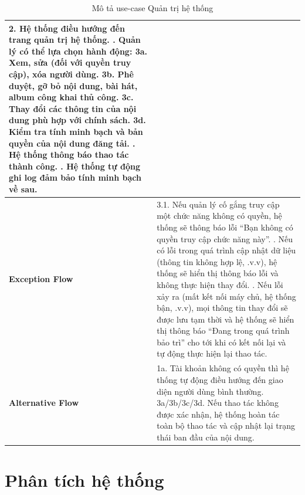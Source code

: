 \documentclass[a4paper]{article}
\newcommand{\cach}{\hspace*{1.5em}\ignorespaces}
\begin{document}
\begin{table}[H]
\begin{tabularx}{\textwidth}{|l|X|}
		2. Hệ thống điều hướng đến trang quản trị hệ thống. \newline
		3. Quản lý có thể lựa chọn hành động: \newline
		\cach 3a. Xem, sửa (đối với quyền truy cập), xóa người dùng. \newline
		\cach 3b. Phê duyệt, gỡ bỏ nội dung, bài hát, album công khai thủ công. \newline
		\cach 3c. Thay đổi các thông tin của nội dung phù hợp với chính sách. \newline
		\cach 3d. Kiểm tra tính minh bạch và bản quyền của nội dung đăng tải. \newline
		4. Hệ thống thông báo thao tác thành công. \newline
		5. Hệ thống tự động ghi log đảm bảo tính minh bạch về sau.                                                                                                                                                                                  \\ \hline
		\textbf{Exception Flow}
		                       & 3.1. Nếu quản lý cố gắng truy cập một chức năng không có quyền, hệ thống sẽ thông báo lỗi ``Bạn không có quyền truy cập chức năng này''. \newline
		3.2. Nếu có lỗi trong quá trình cập nhật dữ liệu (thông tin không hợp lệ, .v.v), hệ thống sẽ hiển thị thông báo lỗi và không thực hiện thay đổi. \newline
		3.3. Nếu lỗi xảy ra (mất kết nối máy chủ, hệ thống bận, .v.v), mọi thông tin thay đổi sẽ được lưu tạm thời và hệ thống sẽ hiển thị thông báo ``Đang trong quá trình bảo trì'' cho tới khi có kết nối lại và tự động thực hiện lại thao tác. \\ \hline
		\textbf{Alternative Flow}
		                       & 1a. Tài khoản không có quyền thì hệ thống tự động điều hướng đến giao diện người dùng bình thường. \newline
		3a/3b/3c/3d. Nếu thao tác không được xác nhận, hệ thống hoàn tác toàn bộ thao tác và cập nhật lại trạng thái ban đầu của nội dung.                                                                                                          \\ \hline
	\end{tabularx}
	\caption{Mô tả use-case Quản trị hệ thống}
\end{table}
\newpage
\section{Phân tích hệ thống}
\end{document}
